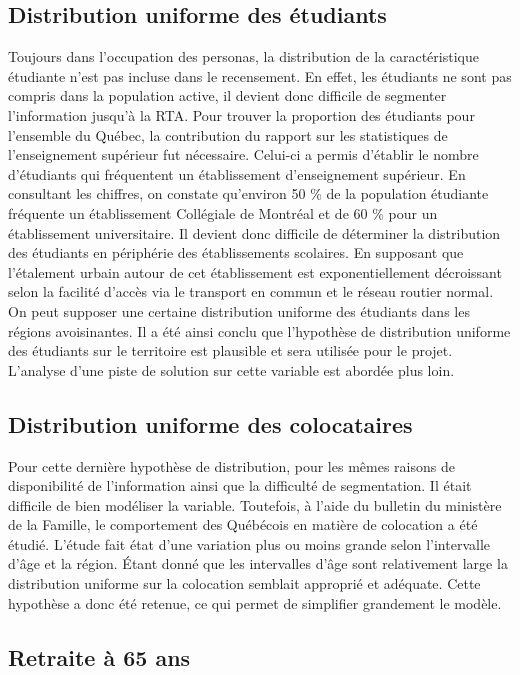 \documentclass[11pt,french]{article}\usepackage[]{graphicx}\usepackage[]{color}
\begin{document}
\subsection{Distribution uniforme des étudiants}

Toujours dans l'occupation des personas, la distribution de la caractéristique étudiante n'est pas incluse dans le recensement. En effet, les étudiants ne sont pas compris dans la population active, il devient donc difficile de segmenter l'information jusqu'à la RTA. Pour trouver la proportion des étudiants pour l'ensemble du Québec, la contribution du rapport sur les statistiques de l'enseignement supérieur fut nécessaire. Celui-ci a permis d'établir le nombre d'étudiants qui fréquentent un établissement d'enseignement supérieur. En consultant les chiffres, on constate qu'environ 50 \% de la population étudiante fréquente un établissement Collégiale de Montréal et de 60 \% pour un établissement universitaire. Il devient donc difficile de déterminer la distribution des étudiants en périphérie des établissements scolaires. En supposant que l'étalement urbain autour de cet établissement est exponentiellement décroissant selon la facilité d'accès via le transport en commun et le réseau routier normal. On peut supposer une certaine distribution uniforme des étudiants dans les régions avoisinantes. Il a été ainsi conclu que l'hypothèse de distribution uniforme des étudiants sur le territoire est plausible et sera utilisée pour le projet. L'analyse d'une piste de solution sur cette variable est abordée plus loin.

\subsection{Distribution uniforme des colocataires}

Pour cette dernière hypothèse de distribution, pour les mêmes raisons de disponibilité de l'information ainsi que la difficulté de segmentation. Il était difficile de bien modéliser la variable. Toutefois, à l'aide du bulletin du ministère de la Famille, le comportement des Québécois en matière de colocation a été étudié. L'étude fait état d'une variation plus ou moins grande selon l'intervalle d'âge et la région. Étant donné que les intervalles d'âge sont relativement large la distribution uniforme sur la colocation semblait approprié et adéquate. Cette hypothèse a donc été retenue, ce qui permet de simplifier grandement le modèle. 

\subsection{Retraite à 65 ans}
\end{document}
